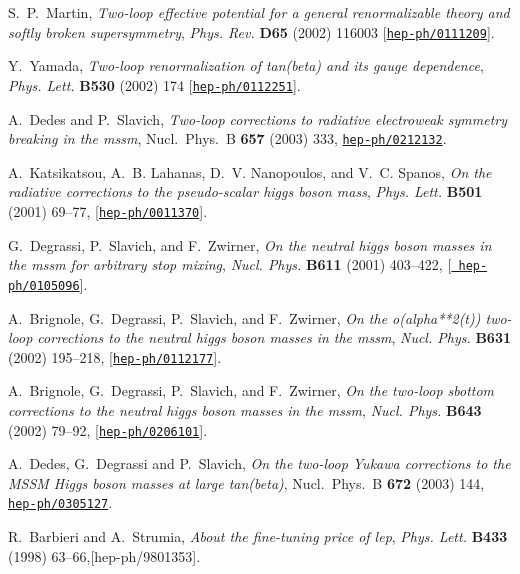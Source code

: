 \documentclass{article}
\begin{document}
\begin{thebibliography}{10}
  S.~P.~Martin,
  {\em Two-loop effective potential for a general renormalizable theory and
  softly broken supersymmetry},
  {\em Phys. Rev.}   {\bf D65} (2002) 116003
  [\href{http://xxx.lanl.gov/abs/hep-ph/0111209}{{\tt hep-ph/0111209}}].

  Y.~Yamada,
  {\em Two-loop renormalization of tan(beta) and its gauge dependence},
  {\em Phys. Lett.}   {\bf B530} (2002) 174
  [\href{http://xxx.lanl.gov/abs/hep-ph/0112251}{{\tt hep-ph/0112251}}].

A.~Dedes and P.~Slavich, {\it Two-loop corrections to radiative electroweak
  symmetry breaking in the mssm}, Nucl.\ Phys.\ B {\bf 657} (2003) 333,
  \href{http://xxx.lanl.gov/abs/hep-ph/0212132}{{\tt hep-ph/0212132}}.

A.~Katsikatsou, A.~B. Lahanas, D.~V. Nanopoulos, and V.~C. Spanos, {\it On the
  radiative corrections to the pseudo-scalar higgs boson mass},  {\em Phys.
  Lett.} {\bf B501} (2001) 69--77,
  [\href{http://xxx.lanl.gov/abs/hep-ph/0011370}{{\tt hep-ph/0011370}}].

G.~Degrassi, P.~Slavich, and F.~Zwirner, {\it On the neutral higgs boson masses
  in the mssm for arbitrary stop mixing},  {\em Nucl. Phys.} {\bf B611} (2001)
  403--422, [\href{http://xxx.lanl.gov/abs/hep-ph/0105096}{{\tt
  hep-ph/0105096}}].

A.~Brignole, G.~Degrassi, P.~Slavich, and F.~Zwirner, {\it On the
  o(alpha**2(t)) two-loop corrections to the neutral higgs boson masses in the
  mssm},  {\em Nucl. Phys.} {\bf B631} (2002) 195--218,
  [\href{http://xxx.lanl.gov/abs/hep-ph/0112177}{{\tt hep-ph/0112177}}].

A.~Brignole, G.~Degrassi, P.~Slavich, and F.~Zwirner, {\it On the two-loop
  sbottom corrections to the neutral higgs boson masses in the mssm},  {\em
  Nucl. Phys.} {\bf B643} (2002) 79--92,
  [\href{http://xxx.lanl.gov/abs/hep-ph/0206101}{{\tt hep-ph/0206101}}].

A.~Dedes, G.~Degrassi and P.~Slavich,
{\it On the two-loop Yukawa corrections to the MSSM Higgs boson masses at
  large tan(beta)},   Nucl.\ Phys.\ B {\bf 672} (2003) 144,
  \href{http://xxx.lanl.gov/abs/hep-ph/0305127}{{\tt hep-ph/0305127}}.

R.~Barbieri and A.~Strumia, {\it About the fine-tuning price of lep},  {\em
  Phys. Lett.} {\bf B433} (1998) 63--66,[hep-ph/9801353]. 



\end{thebibliography}
\end{document}
